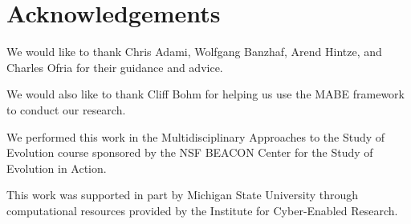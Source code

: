\section{Acknowledgements}

We would like to thank Chris Adami, Wolfgang Banzhaf, Arend Hintze, and Charles Ofria for their guidance and advice.

We would also like to thank Cliff Bohm for helping us use the MABE framework to conduct our research.

We performed this work in the Multidisciplinary Approaches to the Study of Evolution course sponsored by the NSF BEACON Center for the Study of Evolution in Action.

This work was supported in part by Michigan State University through computational resources provided by the Institute for Cyber-Enabled Research.
